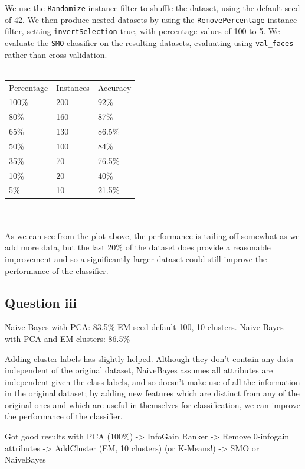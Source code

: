 \documentclass[a4paper]{article}
\begin{document}
We use the {\tt Randomize} instance filter to shuffle the dataset, using the default seed of 42. We then produce nested datasets by using the {\tt RemovePercentage} instance filter, setting {\tt invertSelection} true, with percentage values of 100 to 5. We evaluate the {\tt SMO} classifier on the resulting datasets, evaluating using {\tt val\_faces} rather than cross-validation.\\
\\
\begin{tabular}{lll}
Percentage & Instances & Accuracy\\
100\% & 200 & 92\% \\
80\% & 160 & 87\% \\
65\% & 130 & 86.5\% \\
50\% & 100 & 84\% \\
35\% & 70 & 76.5\% \\
10\% & 20 & 40\% \\
5\% & 10 & 21.5\%
\end{tabular}\\
\\
As we can see from the plot above, the performance is tailing off somewhat as we add more data, but the last 20\% of the dataset does provide a reasonable improvement and so a significantly larger dataset could still improve the performance of the classifier.

\subsection*{Question iii}
Naive Bayes with PCA: 83.5\%
EM seed default 100, 10 clusters.
Naive Bayes with PCA and EM clusters: 86.5\%

Adding cluster labels has slightly helped. Although they don't contain any data independent of the original dataset, NaiveBayes assumes all attributes are independent given the class labels, and so doesn't make use of all the information in the original dataset; by adding new features which are distinct from any of the original ones and which are useful in themselves for classification, we can improve the performance of the classifier.


Got good results with PCA (100\%) -> InfoGain Ranker -> Remove 0-infogain attributes -> AddCluster (EM, 10 clusters) (or K-Means!) -> SMO or NaiveBayes
\end{document}
